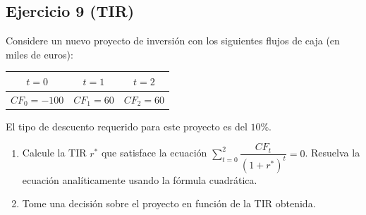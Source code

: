 \documentclass[12pt,a4paper]{article}
\newenvironment{ejercicio}[1]{\subsection*{Ejercicio #1}}{}
\begin{document}
\begin{ejercicio}{9 (TIR)}
Considere un nuevo proyecto de inversión con los siguientes flujos de caja (en miles de euros):
\begin{table}[h]
\centering
\begin{tabular}{c c c}
\toprule
$t=0$ & $t=1$ & $t=2$ \\
\midrule
$CF_0=-100$ & $CF_1=60$ & $CF_2=60$ \\
\bottomrule
\end{tabular}
\end{table}
El tipo de descuento requerido para este proyecto es del $10\%$.
\begin{enumerate}[label=\alph*)]
  \item Calcule la TIR $r^*$ que satisface la ecuación $\sum_{t=0}^{2}\dfrac{CF_t}{(1+r^*)^t}=0$. Resuelva la ecuación analíticamente usando la fórmula cuadrática.
  \item Tome una decisión sobre el proyecto en función de la TIR obtenida.
\end{enumerate}
\end{ejercicio}
\end{document}
